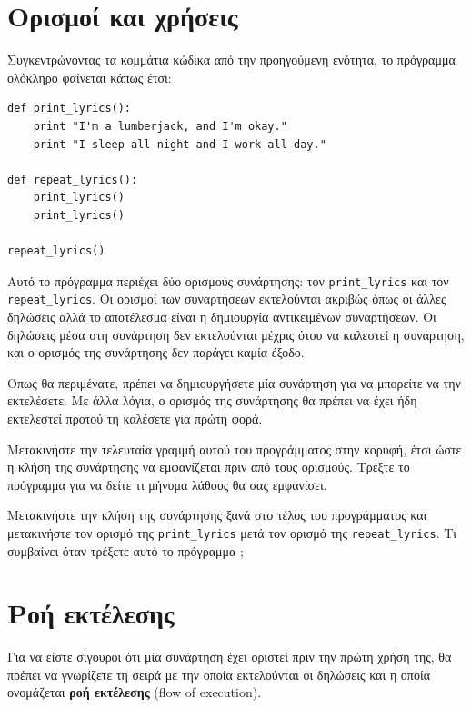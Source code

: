 \documentclass[10pt]{book}
\begin{document}
\section{Ορισμοί και χρήσεις}

Συγκεντρώνοντας τα κομμάτια κώδικα από την προηγούμενη ενότητα,
το πρόγραμμα ολόκληρο φαίνεται κάπως έτσι:


\begin{verbatim}
def print_lyrics():
    print "I'm a lumberjack, and I'm okay."
    print "I sleep all night and I work all day."

def repeat_lyrics():
    print_lyrics()
    print_lyrics()

repeat_lyrics()
\end{verbatim}
%

Αυτό το πρόγραμμα περιέχει δύο ορισμούς συνάρτησης: τον \verb"print_lyrics" 
και τον \verb"repeat_lyrics". Οι ορισμοί των συναρτήσεων εκτελούνται
ακριβώς όπως οι άλλες δηλώσεις αλλά το αποτέλεσμα είναι η δημιουργία αντικειμένων συναρτήσεων. Οι δηλώσεις μέσα στη συνάρτηση δεν εκτελούνται μέχρις ότου να καλεστεί η συνάρτηση, και ο ορισμός της συνάρτησης δεν παράγει καμία έξοδο.

Όπως θα περιμένατε, πρέπει να δημιουργήσετε μία συνάρτηση για να μπορείτε να την εκτελέσετε. Με άλλα λόγια, ο ορισμός της συνάρτησης θα πρέπει να έχει ήδη εκτελεστεί προτού τη καλέσετε για πρώτη φορά.\\


\begin{exercise}
Μετακινήστε την τελευταία γραμμή αυτού του προγράμματος στην κορυφή,
έτσι ώστε η κλήση της συνάρτησης να εμφανίζεται πριν από τους ορισμούς.
Τρέξτε το πρόγραμμα για να δείτε τι μήνυμα λάθους θα σας εμφανίσει.
\end{exercise}

\begin{exercise}
Μετακινήστε την κλήση της συνάρτησης ξανά στο τέλος του προγράμματος
και μετακινήστε τον ορισμό της  \verb"print_lyrics"  μετά τον ορισμό
της  \verb"repeat_lyrics".  Τι συμβαίνει όταν τρέξετε αυτό το πρόγραμμα  ;
\end{exercise}



\section{Ροή εκτέλεσης}

Για να είστε σίγουροι ότι μία συνάρτηση έχει οριστεί πριν την πρώτη
χρήση της, θα πρέπει να γνωρίζετε τη σειρά με την οποία εκτελούνται
οι δηλώσεις και η οποία ονομάζεται {\bf ροή εκτέλεσης} (flow of execution).
\end{document}
